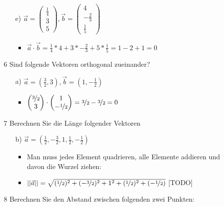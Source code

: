 \documentclass{article}
\begin{document}
\begin{itemize}
\begin{itemize}
\begin{itemize}
			\end{itemize}
			\item[e)]{$\vec{a}=\begin{pmatrix} \frac{1}{4} \\ 3 \\ 5 \end{pmatrix}, \vec{b}=\begin{pmatrix} 4 \\ -\frac{2}{3} \\ \frac{1}{5} \end{pmatrix}$}
			\begin{itemize}
				\item{$\vec{a}\cdot\vec{b}=\frac{1}{4}*4+3*-\frac{2}{3}+5*\frac{1}{5}=1-2+1=0$}
			\end{itemize}
		\end{itemize}
		\item[6]{Sind folgende Vektoren orthogonal zueinander?}
		\begin{itemize}
			\item[a)]{$\vec{a}=(\frac{3}{2}, 3), \vec{b}=(1, -\frac{1}{2})$}
			\begin{itemize}
				\item{$\begin{pmatrix} \nicefrac{3}{2} \\ 3 \end{pmatrix}\cdot \begin{pmatrix} 1 \\ -\nicefrac{1}{2} \end{pmatrix}=\nicefrac{3}{2}-\nicefrac{3}{2}=0$}
			\end{itemize}
		\end{itemize}
		\item[7]{Berechnen Sie die Länge folgender Vektoren}
		\begin{itemize}
			\item[b)]{$\vec{a}=(\frac{1}{2}, -\frac{3}{2}, 1, \frac{1}{2}, -\frac{1}{2})$}
			\begin{itemize}
				\item{Man muss jedes Element quadrieren, alle Elemente addieren und davon die Wurzel ziehen: }
				\item{$||\vec{a}||=\sqrt{(\nicefrac{1}{2})^2+(-\nicefrac{3}{2})^2+1^2+(\nicefrac{1}{2})^2+(-\nicefrac{1}{2})}$ [TODO]}
			\end{itemize}
		\end{itemize}
		\item[8]{Berechnen Sie den Abstand zwischen folgenden zwei Punkten:}
		\begin{itemize}

\end{itemize}
\end{itemize}
\end{document}
